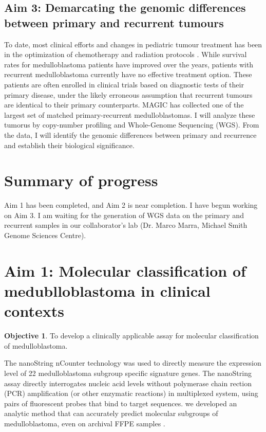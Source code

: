 \documentclass[11pt,letterpaper]{article}
\theoremstyle{definition}
\newtheorem*{objective}{Objective}
\begin{document}
\subsection{Aim 3: Demarcating the genomic differences between primary and recurrent tumours}

To date, most clinical efforts and changes in pediatric tumour treatment has been in the optimization of chemotherapy and radiation protocols . While survival rates for medulloblastoma patients have improved over the years, patients with recurrent medulloblastoma currently have no effective treatment option. These patients are often enrolled in clinical trials based on diagnostic tests of their primary disease, under the likely erroneous assumption that recurrent tumours are identical to their primary counterparts. MAGIC has collected one of the largest set of matched primary-recurrent medulloblastomas. I will analyze these tumorus by copy-number profiling and Whole-Genome Sequencing (WGS). From the data, I will identify the genomic differences between primary and recurrence and establish their biological significance.


\section{Summary of progress}

Aim 1 has been completed, and Aim 2 is near completion.
I have begun working on Aim 3. I am waiting for the generation of WGS data on the primary and recurrent samples in our collaborator's lab (Dr. Marco Marra, Michael Smith Genome Sciences Centre).


\section{Aim 1: Molecular classification of medublloblastoma in clinical contexts}

\begin{objective}
To develop a clinically applicable assay for molecular classification of medulloblastoma.
\end{objective}

The nanoString nCounter technology  was used to directly measure the expression level of 22 medulloblastoma subgroup specific signature genes. The nanoString assay directly interrogates nucleic acid levels without polymerase chain rection (PCR) amplification (or other enzymatic reactions) in multiplexed system, using pairs of fluorescent probes that bind to target sequences. we developed an analytic method that can accurately predict molecular subgroups of medulloblastoma, even on archival FFPE samples .
\end{document}
